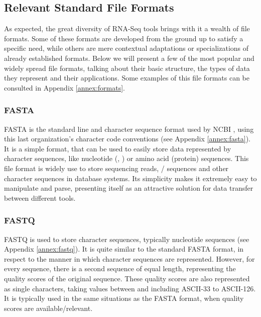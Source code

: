 \subsection{Relevant Standard File Formats}\label{sec:formats}


As expected, the great diversity of RNA-Seq tools brings with it a wealth of
file formats. Some of these formats are developed from the ground up to satisfy
a specific need, while others are mere contextual adaptations or specializations
of already established formats. Below we will present a few of the most popular
and widely spread file formats, talking about their basic structure, the types
of data they represent and their applications. Some examples of this file
formats can be consulted in Appendix \ref{annex:formats}.

\subsubsection*{FASTA}

FASTA is the standard line and character sequence format used by NCBI
\cite{ncbi:fasta}, using this last organization's character code conventions
(see Appendix \ref{annex:fasta}). It is a simple format, that can be used to
easily store data represented by character sequences, like nucleotide (\dna,
\rna) or amino acid (protein) sequences. This file format is widely use to store
sequencing reads, \dna/\rna{} sequences and other character sequences in
database systems. Its simplicity makes it extremely easy to manipulate and
parse, presenting itself as an attractive solution for data transfer between
different tools.

\subsubsection*{FASTQ}

FASTQ is used to store character sequences, typically nucleotide sequences
\cite{Cock2010} (see Appendix \ref{annex:fastq}). It is quite similar to the
standard FASTA format, in respect to the manner in which character sequences are
represented. However, for every sequence, there is a second sequence of equal
length, representing the quality scores of the original sequence. These quality
scores are also represented as single characters, taking values between and
including ASCII-33 to ASCII-126. It is typically used in the same situations as
the FASTA format, when quality scores are available/relevant.

